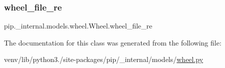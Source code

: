 \mbox{\label{classpip_1_1__internal_1_1models_1_1wheel_1_1Wheel_abf015d9a256a372985a826cf2c7d81cf}} 
\subsubsection{\texorpdfstring{wheel\+\_\+file\+\_\+re}{wheel\_file\_re}}
{\footnotesize\ttfamily pip.\+\_\+internal.\+models.\+wheel.\+Wheel.\+wheel\+\_\+file\+\_\+re\hspace{0.3cm}{\ttfamily [static]}}



The documentation for this class was generated from the following file\+:\begin{DoxyCompactItemize}
\item 
venv/lib/python3./site-\/packages/pip/\+\_\+internal/models/\hyperlink{pip_2__internal_2models_2wheel_8py}{wheel.\+py}\end{DoxyCompactItemize}

